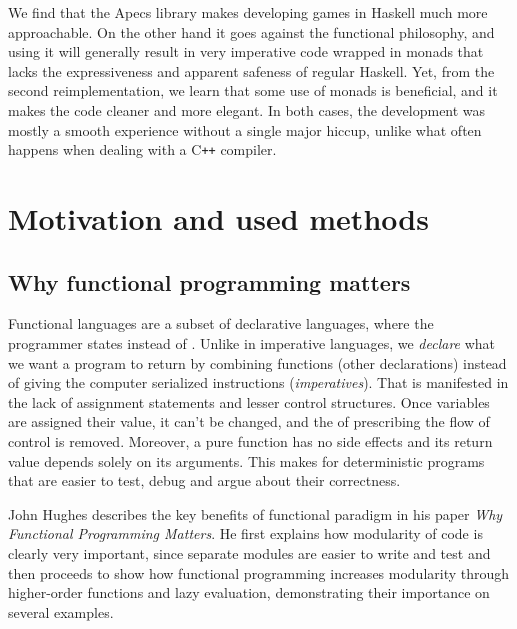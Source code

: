 \documentclass[
  digital, %
  color,   %
  table,   %
  oneside, %
  lof,     %
  lot,     %
]{fithesis3}
\newcommand{\cpp}{C\nolinebreak\texttt{+}\nolinebreak\texttt{+}}
\begin{document}
We find that the Apecs library makes developing games
in Haskell much more approachable. On the other hand
it goes against the functional philosophy, and using it
will generally result in very imperative code wrapped in monads
that lacks the expressiveness and apparent safeness of regular Haskell.
Yet, from the second reimplementation, we learn that
some use of monads is beneficial, and it makes the code cleaner
and more elegant. In both cases, the development was
mostly a smooth experience without a single major hiccup,
unlike what often happens when dealing with a \cpp{} compiler.



\chapter{Motivation and used methods}
\label{chap:motivationandmethods}


\section{Why functional programming matters}
\label{sect:whyfpmatters}

Functional languages are a subset of declarative languages, where the
programmer states  instead of . Unlike in imperative languages,
we \emph{declare} what we want a program to return by combining functions (other declarations)
instead of giving the computer serialized instructions (\emph{imperatives}).
That is manifested in the lack of assignment statements and lesser control structures.
Once variables are assigned their value, it can't be changed,
and the  of prescribing the flow of control
is removed.\cite{whyfpmatters} Moreover, a pure function has no side effects
and its return value depends solely on its arguments. This makes for deterministic
programs that are easier to test, debug and argue about their correctness.

John Hughes describes the key benefits of functional paradigm in his paper
\textit{Why Functional Programming Matters}.\cite{whyfpmatters} He first
explains how modularity of code is clearly very important, since
separate modules are easier to write and test and then proceeds
to show how functional programming increases modularity
through higher-order functions and lazy evaluation, demonstrating
their importance on several examples.
\end{document}
